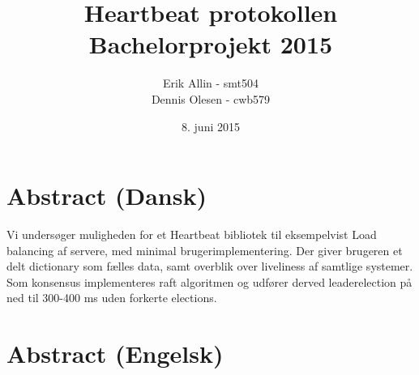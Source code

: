 \documentclass[a4paper,12pt]{article}
\title{Heartbeat protokollen
\\
Bachelorprojekt 2015}
\author{Erik Allin - smt504 \\ Dennis Olesen - cwb579}
\date{8. juni 2015}
\begin{document}
\maketitle
\newpage
\renewcommand*\contentsname{Indholdsfortegnelse}
\tableofcontents
\newpage

\section{Abstract (Dansk)}
Vi undersøger muligheden for et Heartbeat bibliotek til eksempelvist Load balancing af servere, med minimal brugerimplementering. Der giver brugeren et delt dictionary som fælles data, samt overblik over liveliness af samtlige systemer.
\\
Som konsensus implementeres raft algoritmen og udfører derved leaderelection på ned til 300-400 ms uden forkerte elections. 

\section{Abstract (Engelsk)}

\newpage
\end{document}
